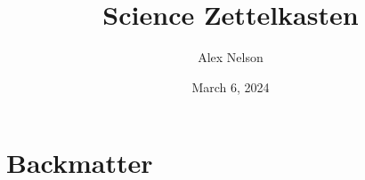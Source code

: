 \documentclass[dvipsnames,HTML]{amsbook}
\title{Science Zettelkasten}
\author{Alex Nelson}
\date{March 6, 2024}
\begin{document}
\frontmatter
\maketitle

\tableofcontents

\mainmatter
\vfill\eject




\backmatter
\part*{Backmatter}

\nocite{*}


\end{document}

